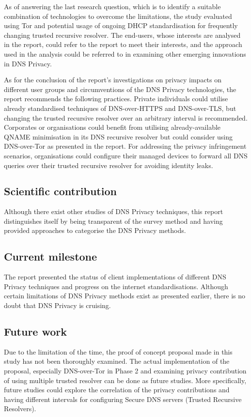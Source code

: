 \documentclass[a4paper,12pt]{article}
\begin{document}
As of answering the last research question, which is to identify a suitable combination of technologies to overcome the limitations, the study evaluated using Tor and potential usage of ongoing DHCP standardisation for frequently changing trusted recursive resolver.
The end-users, whose interests are analysed in the report, could refer to the report to meet their interests, and the approach used in the analysis could be referred to in examining other emerging innovations in DNS Privacy. 

As for the conclusion of the report's investigations on privacy impacts on different user groups and circumventions of the DNS Privacy technologies, the report recommends the following practices. Private individuals could utilise already standardised techniques of DNS-over-HTTPS and DNS-over-TLS, but changing the trusted recursive resolver over an arbitrary interval is recommended. Corporates or organisations could benefit from utilising already-available QNAME minimisation in its DNS recursive resolver but could consider using DNS-over-Tor as presented in the report. For addressing the privacy infringement scenarios, organisations could configure their managed devices to forward all DNS queries over their trusted recursive resolver for avoiding identity leaks.

\subsection{Scientific contribution}
Although there exist other studies of DNS Privacy techniques, this report distinguishes itself by being transparent of the survey method and having provided approaches to categorise the DNS Privacy methods.

\subsection{Current milestone}
The report presented the status of client implementations of different DNS Privacy techniques and progress on the internet standardisations.
Although certain limitations of DNS Privacy methods exist as presented earlier, there is no doubt that DNS Privacy is cruising.

\subsection{Future work}
Due to the limitation of the time, the proof of concept proposal made in this study has not been thoroughly examined.
The actual implementation of the proposal, especially DNS-over-Tor in Phase 2 and examining privacy contribution of using multiple trusted resolver can be done as future studies.
More specifically, future studies could explore the correlation of the privacy contributions and having different intervals for configuring Secure DNS servers (Trusted Recursive Resolvers).
\newpage
\end{document}
